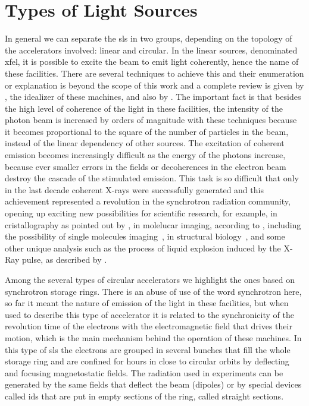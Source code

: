 \section{Types of Light Sources}

    In general we can separate the \gls{sls} in two groups, depending on the topology of the accelerators involved: linear and circular. In the linear sources, denominated \gls{xfel}, it is possible to excite the beam to emit light coherently, hence the name of these facilities. There are several techniques to achieve this and their enumeration or explanation is beyond the scope of this work and a complete review is given by , the idealizer of these machines, and also by . The important fact is that besides the high level of coherence of the light in these facilities, the intensity of the photon beam is increased by orders of magnitude with these techniques because it becomes proportional to the square of the number of particles in the beam, instead of the linear dependency of other sources. The excitation of coherent emission becomes increasingly difficult as the energy of the photons increase, because ever smaller errors in the fields or decoherences in the electron beam destroy the cascade of the stimulated emission. This task is so difficult that only in the last decade coherent X-rays were successfully generated and this achievement represented a revolution in the synchrotron radiation community, opening up exciting new possibilities for scientific research, for example, in cristallography as pointed out by , in molelucar imaging, according to , including the possibility of single molecules imaging~\cite{Barty2016}, in structural biology~\cite{Marx2017}, and some other unique analysis such as the process of liquid explosion induced by the X-Ray pulse, as described by .

    Among the several types of circular accelerators we highlight the ones based on synchrotron storage rings. There is an abuse of use of the word synchrotron here, so far it meant the nature of emission of the light in these facilities, but when used to describe this type of accelerator it is related to the synchronicity of the revolution time of the electrons with the electromagnetic field that drives their motion, which is the main mechanism behind the operation of these machines. In this type of \gls{sls} the electrons are grouped in several bunches that fill the whole storage ring and are confined for hours in close to circular orbits by deflecting and focusing magnetostatic fields. The radiation used in experiments can be generated by the same fields that deflect the beam (dipoles) or by special devices called \gls{ids} that are put in empty sections of the ring, called straight sections.

